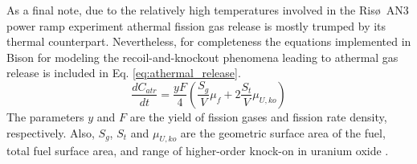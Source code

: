 As a final note, due to the relatively high temperatures involved in the Ris\o~AN3 power ramp experiment athermal fission gas release is mostly trumped by its thermal counterpart. Nevertheless, for completeness the equations implemented in Bison for modeling the recoil-and-knockout phenomena leading to athermal gas release is included in Eq. \ref{eq:athermal_release}. 
\begin{equation}
\label{eq:athermal_release}
 \frac{dC_{atr}}{dt} = \frac{yF}{4} \left( \frac{S_g}{V} \mu_f +2 \frac{S_t}{V}\mu_{U,ko}\right)  
\end{equation}
The parameters $y$ and $F$ are the yield of fission gases and fission rate density, respectively. Also, $S_g$, $S_t$ and $\mu_{U,ko}$ are the geometric surface area of the fuel, total fuel surface area, and range of higher-order knock-on in uranium oxide \cite{Pastore2}. 



